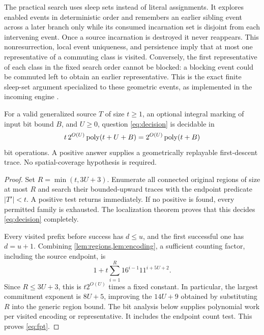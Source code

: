 The practical search uses sleep sets instead of literal assignments. It
explores enabled events in deterministic order and remembers an earlier
sibling event across a later branch only while its consumed incarnation
set is disjoint from each intervening event. Once a source incarnation is
destroyed it never reappears. This nonresurrection, local event uniqueness,
and persistence imply that at most one representative of a commuting class
is visited. Conversely, the first representative of each class in the fixed
search order cannot be blocked: a blocking event could be commuted left to
obtain an earlier representative. This is the exact finite sleep-set argument
specialized to these geometric events, as implemented in the incoming engine
\cite{incoming-trace}.

\begin{theorem}\label{thm:fpt}
For a valid generalized source $T$ of size $t\ge1$, an optional integral
marking of input bit bound $B$, and $U\ge0$, question \eqref{eq:decision}
is decidable in
\begin{equation}\label{eq:fpt}
 t\,2^{O(U)}\operatorname{poly}(t+U+B)=2^{O(U)}\operatorname{poly}(t+B)
\end{equation}
bit operations. A positive answer supplies a geometrically replayable
first-descent trace. No spatial-coverage hypothesis is required.
\end{theorem}
\begin{proof}
Set $R=\min(t,3U+3)$. Enumerate all connected original regions of size at
most $R$ and search their bounded-upward traces with the endpoint predicate
$|T'|<t$. A positive test returns immediately. If no positive is found,
every permitted family is exhausted. The localization theorem proves that
this decides \eqref{eq:decision} completely.

Every visited prefix before success has $d\le u$, and the first successful
one has $d=u+1$. Combining \cref{lem:regions,lem:encoding}, a sufficient
counting factor, including the source endpoint, is
\begin{equation}\label{eq:explicit-count}
 1+t\sum_{i=1}^{R}16^{i-1}11^{i+5U+2}.
\end{equation}
Since $R\le3U+3$, this is $t2^{O(U)}$ times a fixed constant. In particular,
the largest commitment exponent is $8U+5$, improving the $14U+9$ obtained
by substituting $R$ into the generic region bound. The bit analysis below
supplies polynomial work per visited encoding or representative. It includes
the endpoint count test. This proves \eqref{eq:fpt}.
\end{proof}

